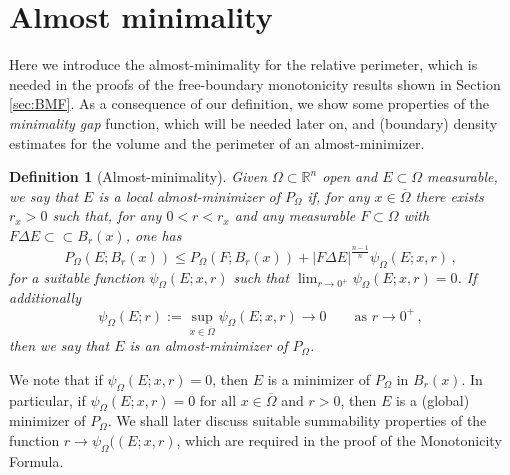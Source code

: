 \documentclass[a4paper,reqno,11pt]{amsart}
\newtheorem{definition}[theorem]{Definition}
\newcommand{\R}{\mathbb{R}}
\newcommand{\difsim}{\Delta}
\newcommand{\pr}{P_{\Omega}}
\begin{document}
\section{Almost minimality}
\label{sec:almost-minimality}
Here we introduce the almost-minimality for the relative perimeter, which is needed in the proofs of the free-boundary monotonicity results shown in Section \ref{sec:BMF}. As a consequence of our definition, we show some properties of the \textit{minimality gap} function, which will be needed later on, and (boundary) density estimates for the volume and the perimeter of an almost-minimizer. 
\begin{definition}[Almost-minimality] \label{def:A-M}
Given $\Omega \subset \R^{n}$ open and $E \subset \Omega$ measurable, we say that $E$ is a \emph{local almost-minimizer} of $\pr$ if, for any $x\in \overline{\Omega}$ there exists $r_{x} > 0$ such that, for any $0 < r < r_{x}$ and any measurable $F\subset\Omega$ with $F \difsim E \subset \subset B_{r}(x)$, one has
\begin{equation}\label{eq:A-M}
\pr(E;B_{r}(x)) \leq \pr(F;B_{r}(x)) + |F \difsim E|^{\frac{n-1}{n}} \psi_{\Omega}(E;x,r) \, ,
\end{equation}
for a suitable function $\psi_{\Omega}(E;x,r)$ such that $\lim_{r\to 0^{+}}\psi_{\Omega}(E;x,r) = 0$. 
If additionally
\[
\psi_{\Omega}(E;r):= \sup_{x\in \overline{\Omega}} \psi_{\Omega}(E;x,r) \rightarrow 0\qquad \text{as }r\to 0^{+}\,,
\] 
then we say that $E$ is an \emph{almost-minimizer} of $\pr$. 
\end{definition}
%
We note that if $\psi_{\Omega}(E;x,r) = 0$, then $E$ is a minimizer of $\pr$ in $B_{r}(x)$. In particular, if $\psi_{\Omega}(E;x,r) = 0$ for all $x\in \overline{\Omega}$ and $r>0$, then $E$ is a (global) minimizer of $\pr$. We shall later discuss suitable summability properties of the function $r\to \psi_{\Omega}((E;x,r)$, which are required in the proof of the Monotonicity Formula. 
\end{document}
